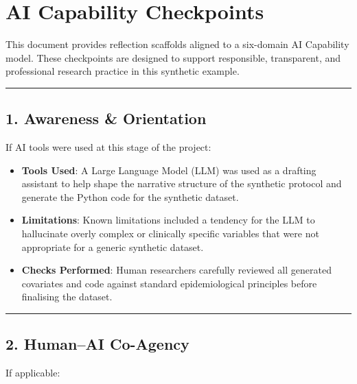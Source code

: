 \documentclass[
]{report}
\author{}
\date{}
\providecommand{\tightlist}{%
  \setlength{\itemsep}{0pt}\setlength{\parskip}{0pt}}
\renewcommand*\contentsname{Table of contents}
\newcommand\contentsname{Table of contents}
\begin{document}
\renewcommand*\contentsname{Table of contents}
{
\hypersetup{linkcolor=}
\setcounter{tocdepth}{2}
\tableofcontents
}

\chapter{AI Capability Checkpoints}\label{ai-capability-checkpoints}

This document provides reflection scaffolds aligned to a six-domain AI
Capability model. These checkpoints are designed to support responsible,
transparent, and professional research practice in this synthetic
example.

\begin{center}\rule{0.5\linewidth}{0.5pt}\end{center}

\section{1. Awareness \& Orientation}\label{awareness-orientation}

If AI tools were used at this stage of the project:

\begin{itemize}
\tightlist
\item
  \textbf{Tools Used}: A Large Language Model (LLM) was used as a
  drafting assistant to help shape the narrative structure of the
  synthetic protocol and generate the Python code for the synthetic
  dataset.
\item
  \textbf{Limitations}: Known limitations included a tendency for the
  LLM to hallucinate overly complex or clinically specific variables
  that were not appropriate for a generic synthetic dataset.
\item
  \textbf{Checks Performed}: Human researchers carefully reviewed all
  generated covariates and code against standard epidemiological
  principles before finalising the dataset.
\end{itemize}

\begin{center}\rule{0.5\linewidth}{0.5pt}\end{center}

\section{2. Human--AI Co-Agency}\label{humanai-co-agency}

If applicable:
\end{document}
